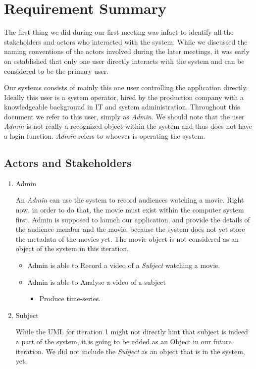 \documentclass[12pt,a4paper,man]{report}
\begin{document}
\chapter{Requirement Summary}
\label{sec:org5f7af0b}
The first thing we did during our first meeting was infact to identify all the stakeholders and actors who interacted with the system. While we discussed the naming conventions of the actors involved during the later meetings, it was early on established that only one user directly interacts with the system and can be considered to be the primary user.

Our systems consists of mainly this one user controlling the application directly. Ideally this user is a system operator, hired by the production company with a knowledgeable background in IT and system administration. Throughout this document we refer to this user, simply as \emph{Admin}. We should note that the user \emph{Admin} is not really a recognized object within the system and thus does not have a login function. \emph{Admin} refers to whoever is operating the system.

\section{Actors and Stakeholders}
\label{sec:orgfa458b7}
\begin{enumerate}
\item Admin
\label{sec:org9f6d705}

An \emph{Admin} can use the system to record audiences watching a movie. Right now, in order to do that, the movie must exist within the computer system first. Admin is supposed to launch our application, and provide the details of the audience member and the movie, because the system does not yet store the metadata of the movies yet. The movie object is not considered as an object of the system in this iteration.

\begin{itemize}
\item Admin is able to Record a video of a \emph{Subject} watching a movie.
\item Admin is able to Analyse a video of a subject
\begin{itemize}
\item Produce time-series.
\end{itemize}
\end{itemize}

\item Subject
\label{sec:org05f5b64}

While the UML for iteration 1 might not directly hint that subject is indeed a part of the system, it is going to be added as an Object in our future iteration. We did not include the \emph{Subject} as an object that is in the system, yet.
\end{enumerate}
\end{document}
